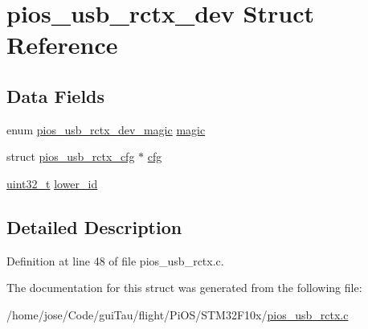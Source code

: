 \hypertarget{structpios__usb__rctx__dev}{\section{pios\-\_\-usb\-\_\-rctx\-\_\-dev Struct Reference}
\label{structpios__usb__rctx__dev}
}
\subsection*{Data Fields}
\begin{DoxyCompactItemize}
\item 
enum \hyperlink{group___p_i_o_s___u_s_b___r_c_t_x_gab6be8817fc2ea56ea36728686255d0dc}{pios\-\_\-usb\-\_\-rctx\-\_\-dev\-\_\-magic} \hyperlink{group___p_i_o_s___u_s_b___r_c_t_x_ga8f71b1caefbf4e9ed2a032bd56d63c73}{magic}
\item 
struct \hyperlink{structpios__usb__rctx__cfg}{pios\-\_\-usb\-\_\-rctx\-\_\-cfg} $\ast$ \hyperlink{group___p_i_o_s___u_s_b___r_c_t_x_gafd4556f7f9de22ef19636d97457b59b5}{cfg}
\item 
\hyperlink{stdint_8h_a435d1572bf3f880d55459d9805097f62}{uint32\-\_\-t} \hyperlink{group___p_i_o_s___u_s_b___r_c_t_x_gab5b742c93aa7545ca0a497ffb8b0c298}{lower\-\_\-id}
\end{DoxyCompactItemize}


\subsection{Detailed Description}


Definition at line 48 of file pios\-\_\-usb\-\_\-rctx.\-c.



The documentation for this struct was generated from the following file\-:\begin{DoxyCompactItemize}
\item 
/home/jose/\-Code/gui\-Tau/flight/\-Pi\-O\-S/\-S\-T\-M32\-F10x/\hyperlink{pios__usb__rctx_8c}{pios\-\_\-usb\-\_\-rctx.\-c}\end{DoxyCompactItemize}
